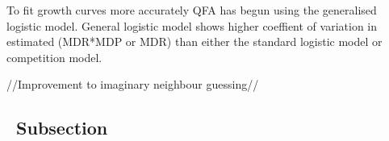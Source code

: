To fit growth curves more accurately QFA has begun using the
generalised logistic model. General logistic model shows higher
coeffient of variation in estimated (MDR*MDP or MDR) than either the
standard logistic model or competition model.


//Improvement to imaginary neighbour guessing//


\subsection{\thesubsection~Subsection}

